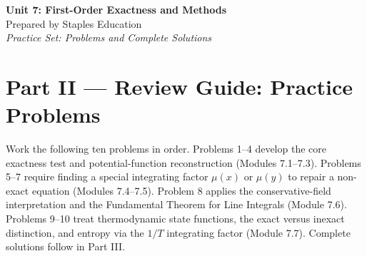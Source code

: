 




\begin{center}
    {\LARGE \bfseries Unit 7: First-Order Exactness and Methods}\\[6pt]
    {\large Prepared by Staples Education}\\[4pt]
    {\itshape Practice Set: Problems and Complete Solutions}
\end{center}

\vspace{0.4em}

{}
\section*{Part II --- Review Guide: Practice Problems}

Work the following ten problems in order. Problems 1--4 develop the core
exactness test and potential-function reconstruction (Modules 7.1--7.3).
Problems 5--7 require finding a special integrating factor $\mu(x)$ or $\mu(y)$
to repair a non-exact equation (Modules 7.4--7.5). Problem 8 applies the
conservative-field interpretation and the Fundamental Theorem for Line
Integrals (Module 7.6). Problems 9--10 treat thermodynamic state functions,
the exact versus inexact distinction, and entropy via the $1/T$ integrating
factor (Module 7.7). Complete solutions follow in Part III.

